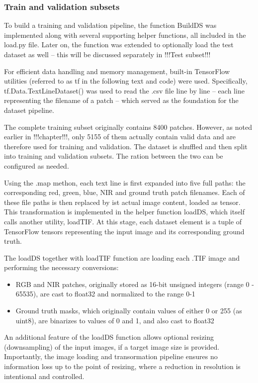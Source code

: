 {\subsubsection{Train and validation subsets}

To build a training and validation pipeline, the function BuildDS was implemented along with several supporting helper functions, all included in the load.py file. Later on, the function was extended to optionally load the test dataset as well – this will be discussed separately in !!!Test subset!!!

For efficient data handling and memory management, built-in TensorFlow utilities (referred to as tf in the following text and code) were used. Specifically, tf.Data.TextLineDataset() was used to read the .csv file line by line – each line representing the filename of a patch – which served as the foundation for the dataset pipeline.

The complete training subset originally contains 8400 patches. However, as noted earlier in !!!chapter!!!, only 5155 of them actually contain valid data and are therefore used for training and validation. The dataset is shuffled and then split into training and validation subsets. The ration between the two can be configured as needed.

Using the .map methon, each text line is first expanded into five full paths: the corresponding red, green, blue, NIR and ground truth patch filenames. Each of these file paths is then replaced by ist actual image content, loaded as tensor. This transformation is implemented in the helper function loadDS, which itself calls another utility, loadTIF. At this stage, each dataset element is a tuple of TensorFlow tensors representing the input image and its corresponding ground truth.

The loadDS together with loadTIF function are loading each .TIF image and performing the necessary conversions:

\begin{itemize}
    \item RGB and NIR patches, originally stored as 16-bit unsigned integers (range 0 - 65535), are cast to float32 and normalized to the range 0-1
    \item Ground truth masks, which originally contain values of either 0 or 255 (as uint8), are binarizes to values of 0 and 1, and also cast to float32
\end{itemize}

An additional feature of the loadDS function allows optional resizing (downsampling) of the input images, if a target image size is provided. Importantly, the image loading and transormation pipeline ensures no information loss up to the point of resizing, where a reduction in resolution is intentional and controlled.

}
